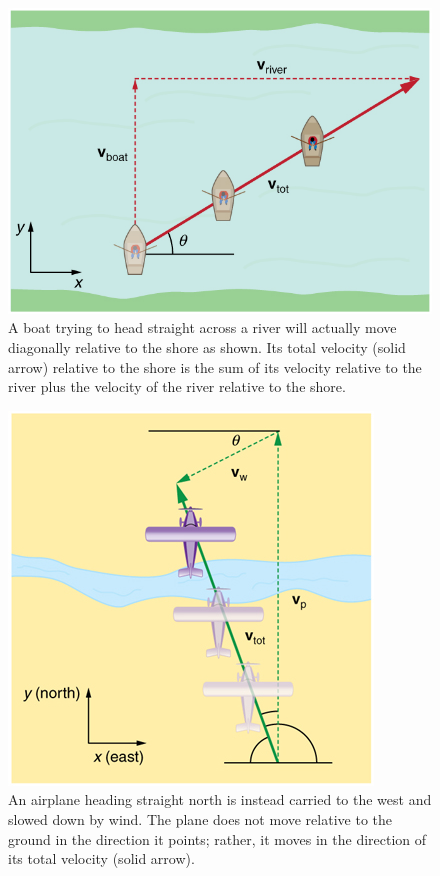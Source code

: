 \documentclass[
]{book}
\begin{document}
\begin{figure}
\hypertarget{import-auto-id1635451}{%
\centering
\includegraphics{images/Figure_03_05_01a.jpg}
\caption{A boat trying to head straight across a river will actually move
diagonally relative to the shore as shown. Its total velocity (solid
arrow) relative to the shore is the sum of its velocity relative to the
river plus the velocity of the river relative to the
shore.}\label{import-auto-id1635451}
}
\end{figure}

\begin{figure}
\hypertarget{import-auto-id1851600}{%
\centering
\includegraphics{images/Figure_03_05_02a.jpg}
\caption{An airplane heading straight north is instead carried to the west and
slowed down by wind. The plane does not move relative to the ground in
the direction it points; rather, it moves in the direction of its total
velocity (solid
arrow).}\label{import-auto-id1851600}
}
\end{figure}
\end{document}
